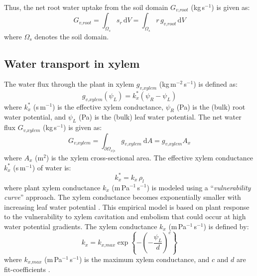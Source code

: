 Thus, the net root water uptake from the soil domain $G_{\textit{v,root}}$ (kg\,s$^{-1}$) is given as:
\begin{equation}
G_{\textit{v,root}} = \int_{\Omega_s} s_r\,\mathrm{d}V = \int_{\Omega_s} r\,g_{\textit{v,root}}\,\mathrm{d}V
\end{equation}
where $\Omega_s$ denotes the soil domain. 


\subsection{Water transport in xylem}

The water flux through the plant in xylem $g_{\textit{v,xylem}}$ (kg\,m$^{-2}$\,s$^{-1}$) is defined as:
\begin{equation}
g_{\textit{v,xylem}}(\psi_L) = k_x^* \left(\psi_R - \psi_L\right)
\end{equation}
where $k_x^*$ (s\,m$^{-1}$) is the effective xylem conductance, $\psi_R$ (Pa) is the (bulk) root water potential, and $\psi_L$ (Pa) is the (bulk) leaf water potential. The net water flux $G_{\textit{v,xylem}}$ (kg\,s$^{-1}$) is given as:
\begin{equation}   
G_{\textit{v,xylem}} = \int_{\partial\Omega_{x|s}} g_{\textit{v,xylem}}~\mathrm{d}A = g_{\textit{v,xylem}} A_x
\label{eq:netwaterflux_xylem}
\end{equation}
where $A_x$ (m$^2$) is the xylem cross-sectional area. The effective xylem conductance $k_x^*$ (s\,m$^{-1}$) of water is:
\begin{equation}
k_x^* = k_x \, \rho_l
\end{equation}
where plant xylem conductance $k_x$ (m\,Pa$^{-1}$\,s$^{-1}$) is modeled using a ``\textit{vulnerability curve}'' approach. The xylem conductance becomes exponentially smaller with increasing leaf water potential \citep{Volpe2013}. This empirical model is based on plant response to the vulnerability to xylem cavitation and embolism that could occur at high water potential gradients. The xylem conductance $k_x$ (m\,Pa$^{-1}$\,s$^{-1}$) is defined by:
\begin{equation}
k_x = k_{\textit{x,max}} \exp \left\{ - \left( - \frac{\psi_L}{d}\right)^c \right\}
\end{equation}
where $k_{\textit{x,max}}$ (m\,Pa$^{-1}$\,s$^{-1}$) is the maximum xylem conductance, and $c$ and $d$ are fit-coefficients \citep{Volpe2013}.



